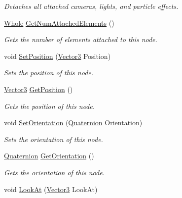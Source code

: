 \begin{DoxyCompactItemize}
\begin{DoxyCompactList}\small\item\em Detaches all attached cameras, lights, and particle effects. \item\end{DoxyCompactList}\item 
\hyperlink{namespacephys_a460f6bc24c8dd347b05e0366ae34f34a}{Whole} \hyperlink{classphys_1_1Node_ae4ee282575f7b1e6bb9dfcda15fcfd47}{GetNumAttachedElements} ()
\begin{DoxyCompactList}\small\item\em Gets the number of elements attached to this node. \item\end{DoxyCompactList}\item 
void \hyperlink{classphys_1_1Node_ab8dc3aa58292b0156e67dc3684099bbe}{SetPosition} (\hyperlink{classphys_1_1Vector3}{Vector3} Position)
\begin{DoxyCompactList}\small\item\em Sets the position of this node. \item\end{DoxyCompactList}\item 
\hyperlink{classphys_1_1Vector3}{Vector3} \hyperlink{classphys_1_1Node_adbb895705afa97bd5d824f0abf59e11a}{GetPosition} ()
\begin{DoxyCompactList}\small\item\em Gets the position of this node. \item\end{DoxyCompactList}\item 
void \hyperlink{classphys_1_1Node_a3799cc7b685a4bbbb16b6f9b917824a8}{SetOrientation} (\hyperlink{classphys_1_1Quaternion}{Quaternion} Orientation)
\begin{DoxyCompactList}\small\item\em Sets the orientation of this node. \item\end{DoxyCompactList}\item 
\hyperlink{classphys_1_1Quaternion}{Quaternion} \hyperlink{classphys_1_1Node_af9bda096f298c0ae692d52dd3b7c3733}{GetOrientation} ()
\begin{DoxyCompactList}\small\item\em Gets the orientation of this node. \item\end{DoxyCompactList}\item 
void \hyperlink{classphys_1_1Node_a545f5696660b3e7c07154b29421ab179}{LookAt} (\hyperlink{classphys_1_1Vector3}{Vector3} LookAt)

\end{DoxyCompactItemize}
